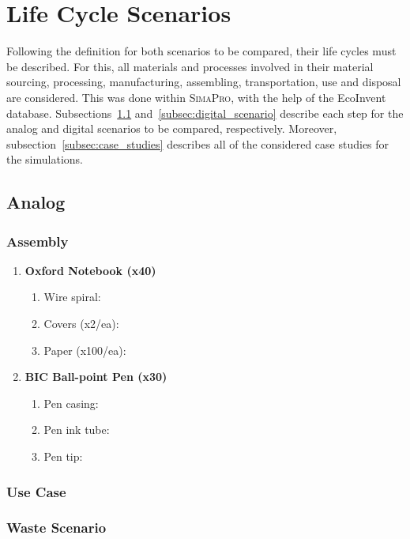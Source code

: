\section{Life Cycle Scenarios}\label{sec:scenarios}
Following the definition for both scenarios to be compared, their life cycles must be described. For this, all materials and processes involved in their material sourcing, processing, manufacturing, assembling, transportation, use and disposal are considered. This was done within \textsc{SimaPro}, with the help of the EcoInvent database. Subsections~\ref{subsec:analog_scenario} and~\ref{subsec:digital_scenario} describe each step for the analog and digital scenarios to be compared, respectively. Moreover, subsection~\ref{subsec:case_studies} describes all of the considered case studies for the simulations.


\subsection{Analog}\label{subsec:analog_scenario}

\subsubsection*{Assembly}
\begin{enumerate}
    \item \textbf{Oxford Notebook (x40)}
    \begin{enumerate}
        \item Wire spiral:
        \item Covers (x2/ea):
        \item Paper (x100/ea):
    \end{enumerate}
    \item \textbf{BIC Ball-point Pen (x30)}
    \begin{enumerate}
        \item Pen casing:
        \item Pen ink tube:
        \item Pen tip:
    \end{enumerate}
\end{enumerate}

\subsubsection*{Use Case}

\subsubsection*{Waste Scenario}


